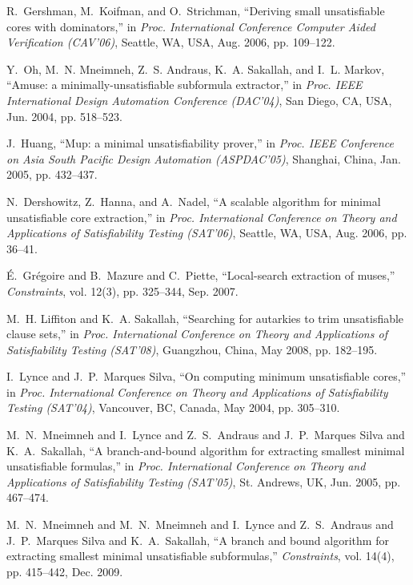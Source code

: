 \documentclass[journal]{IEEEtran}
\begin{document}
\begin{thebibliography}{49}
R.~Gershman, M.~Koifman, and O.~Strichman, ``Deriving small unsatisfiable cores
  with dominators,'' in \emph{Proc. International Conference Computer Aided
  Verification ({CAV}'06)}, Seattle, WA, USA, Aug. 2006, pp. 109--122.

Y.~Oh, M.~N. Mneimneh, Z.~S. Andraus, K.~A. Sakallah, and I.~L. Markov,
  ``Amuse: a minimally-unsatisfiable subformula extractor,'' in \emph{Proc.
  {IEEE} International Design Automation Conference ({DAC}'04)}, San Diego, CA,
  USA, Jun. 2004, pp. 518--523.

J.~Huang, ``Mup: a minimal unsatisfiability prover,'' in \emph{Proc. {IEEE}
  Conference on Asia South Pacific Design Automation ({ASPDAC}'05)}, Shanghai,
  China, Jan. 2005, pp. 432--437.

N.~Dershowitz, Z.~Hanna, and A.~Nadel, ``A scalable algorithm for minimal
  unsatisfiable core extraction,'' in \emph{Proc. International Conference on
  Theory and Applications of Satisfiability Testing ({SAT}'06)}, Seattle, WA,
  USA, Aug. 2006, pp. 36--41.

\'E.~Gr\'egoire and B.~Mazure and C.~Piette, ``Local-search extraction of muses,'' \emph{Constraints}, vol. 12(3), pp.
  325--344, Sep. 2007.

M.~H. Liffiton and K.~A. Sakallah, ``Searching for autarkies to trim
  unsatisfiable clause sets,'' in \emph{Proc. International Conference on
  Theory and Applications of Satisfiability Testing ({SAT}'08)}, Guangzhou,
  China, May 2008, pp. 182--195.

I.~Lynce and J.~P.~Marques Silva, ``On computing minimum unsatisfiable cores,'' in \emph{Proc.
  International Conference on Theory and Applications of Satisfiability Testing
  ({SAT}'04)}, Vancouver, BC, Canada, May 2004, pp. 305--310.

M.~N.~Mneimneh and I.~Lynce and Z.~S.~Andraus and J.~P.~Marques Silva and K.~A.~Sakallah, ``A branch-and-bound algorithm for extracting smallest minimal
  unsatisfiable formulas,'' in \emph{Proc. International Conference on Theory
  and Applications of Satisfiability Testing ({SAT}'05)}, St. Andrews, UK, Jun.
  2005, pp. 467--474.

M.~N.~Mneimneh and M.~N.~Mneimneh and I.~Lynce and Z.~S.~Andraus and J.~P.~Marques Silva and K.~A.~Sakallah, ``A branch and bound algorithm for extracting smallest minimal
  unsatisfiable subformulas,'' \emph{Constraints}, vol. 14(4), pp. 415--442,
  Dec. 2009.


\end{thebibliography}
\end{document}
